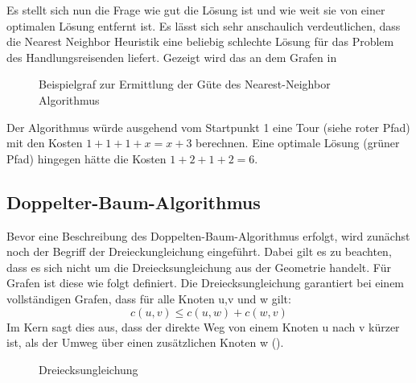 \documentclass{article}
\begin{document}
Es stellt sich nun die Frage wie gut die Lösung ist und wie weit sie von einer optimalen Lösung entfernt ist. Es lässt sich sehr anschaulich verdeutlichen, dass die Nearest Neighbor Heuristik eine beliebig schlechte Lösung für das Problem des Handlungsreisenden liefert. Gezeigt wird das an dem Grafen in  
\begin{figure}[H]
\centering
{}
\caption{Beispielgraf zur Ermittlung der Güte des Nearest-Neighbor Algorithmus}
\label{fig:nearest-neighbor-guete}
\end{figure}
Der Algorithmus würde ausgehend vom Startpunkt 1 eine Tour (siehe roter Pfad) mit den Kosten $1+1+1+x = x +3$ berechnen. Eine optimale Lösung (grüner Pfad) hingegen hätte die Kosten $1+2+1+2 = 6$.


\subsection{Doppelter-Baum-Algorithmus}
Bevor eine Beschreibung des Doppelten-Baum-Algorithmus erfolgt, wird zunächst noch der Begriff der Dreieckungleichung eingeführt. Dabei gilt es zu beachten, dass es sich nicht um die Dreiecksungleichung aus der Geometrie handelt. Für Grafen ist diese wie folgt definiert.
Die Dreiecksungleichung garantiert bei einem vollständigen Grafen, dass für alle Knoten u,v und w gilt:
\begin{equation}
c(u,v) \leq c(u,w) + c(w,v)
\end{equation}
Im Kern sagt dies aus, dass der direkte Weg von einem Knoten u nach v kürzer ist, als der Umweg über einen zusätzlichen Knoten w ().
\begin{figure}[H]
\centering
{}
\caption{Dreiecksungleichung}
\label{fig:dreiecksungleichung}
\end{figure}
\end{document}
